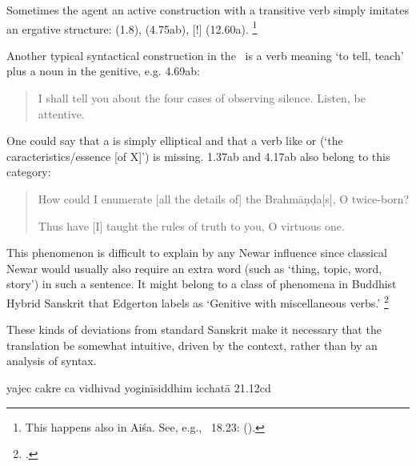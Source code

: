 Sometimes the agent an active construction with a transitive verb
simply imitates an ergative structure:  (1.8),
 (4.75ab),
[!]  (12.60a).%
		\footnote{This happens also in Aiśa. See, e.g., \SiddhYogMata\ 18.23: 
		 ().}

\label{tellplusgen}Another typical syntactical construction in the \VSS\ is a verb
meaning `to tell, teach' plus a noun in the genitive, e.g. 4.69ab:

\begin{quote}

        I shall tell you about the four cases of observing silence. 
        Listen, be attentive.
\end{quote}

\noindent
One could say that  a is simply elliptical and that
a verb like  or  
(`the caracteristics/essence [of X]') is missing. 1.37ab and 4.17ab
also belong to this category:

\begin{quote}


How could I enumerate [all the details of] the Brahmāṇḍa[s], O twice-born?


Thus have [I] taught the rules of truth to you, O virtuous one.

\end{quote}

\noindent
This phenomenon is difficult to explain by any Newar influence since
classical Newar would usually also require an 
extra word (such as  `thing, topic, word, story') in such a sentence.
It might belong to a class of phenomena in Buddhist Hybrid Sanskrit 
that Edgerton labels as `Genitive with miscellaneous verbs.'%
		\footnote{.}

These kinds of deviations from standard Sanskrit make it
necessary that the translation be somewhat intuitive,
driven by the context, rather than by an analysis of syntax.




yajec cakre ca vidhivad yoginīsiddhim icchatā 21.12cd


